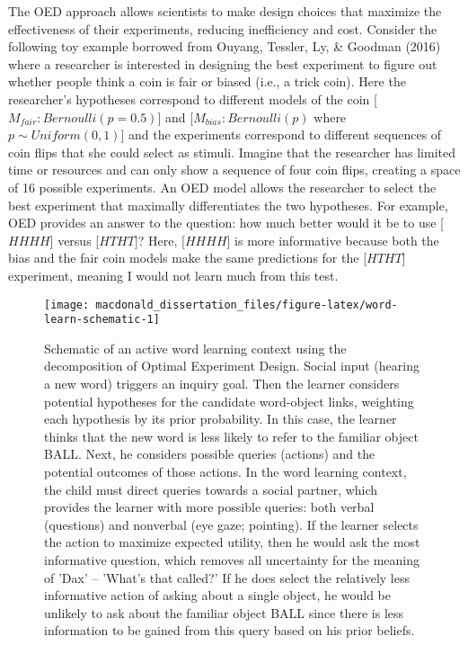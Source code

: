 \documentclass[oneside]{report}
\begin{document}
The OED approach allows scientists to make design choices that maximize
the effectiveness of their experiments, reducing inefficiency and cost.
Consider the following toy example borrowed from Ouyang, Tessler, Ly, \&
Goodman (2016) where a researcher is interested in designing the best
experiment to figure out whether people think a coin is fair or biased
(i.e., a trick coin). Here the researcher's hypotheses correspond to
different models of the coin {[}\(M_{fair}: Bernoulli(p = 0.5)\){]} and
{[}\(M_{bias}: Bernoulli(p)\) where \(p \sim Uniform(0,1)\){]} and the
experiments correspond to different sequences of coin flips that she
could select as stimuli. Imagine that the researcher has limited time or
resources and can only show a sequence of four coin flips, creating a
space of 16 possible experiments. An OED model allows the researcher to
select the best experiment that maximally differentiates the two
hypotheses. For example, OED provides an answer to the question: how
much better would it be to use {[}\(HHHH\){]} versus {[}\(HTHT\){]}?
Here, {[}\(HHHH\){]} is more informative because both the bias and the
fair coin models make the same predictions for the {[}\(HTHT\){]}
experiment, meaning I would not learn much from this test.
\begin{figure}[!t]

{\centering \texttt{[image: macdonald\_dissertation\_files/figure-latex/word-learn-schematic-1]} 

}

\caption[Schematic of an active word learning context.]{Schematic of an active word learning context using the decomposition of Optimal Experiment Design. Social input (hearing a new word) triggers an inquiry goal. Then the learner considers potential hypotheses for the candidate word-object links, weighting each hypothesis by its prior probability. In this case, the learner thinks that the new word is less likely to refer to the familiar object BALL. Next, he considers possible queries (actions) and the potential outcomes of those actions. In the word learning context, the child must direct queries towards a social partner, which provides the learner with more possible queries: both verbal (questions) and nonverbal (eye gaze; pointing). If the learner selects the action to maximize expected utility, then he would ask the most informative question, which removes all uncertainty for the meaning of 'Dax' -- 'What's that called?' If he does select the relatively less informative action of asking about a single object, he would be unlikely to ask about the familiar object BALL since there is less information to be gained from this query based on his prior beliefs.}\label{fig:word-learn-schematic}
\end{figure}
\end{document}
